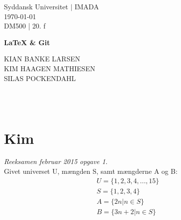 \documentclass[12pt, a4paper]{article}
\begin{document}
\begin{titlepage} 
\begin{centering}
\large Syddansk Universitet $|$ IMADA \\
\today \\
DM500 | 20. f\\

\vspace{4CM}

\huge{\bf \LaTeX{} \& Git } \\

\vspace{\fill}

\fontsize{14}{19.2} {
    \selectfont
    KIAN BANKE LARSEN \vspace{5pt} \\
    KIM HAAGEN MATHIESEN \vspace{5pt} \\
    SILAS POCKENDAHL \vspace{5pt} \\
    \quad
} \\

\vspace{\fill}

\\\vspace{.55cm}
\end{centering}

\end{titlepage}

\section{Kim}
\textit{Reeksamen februar 2015 opgave 1.}\\
Givet universet U, mængden S, samt mængderne A og B: \\
    \begin{gather*}
    U = \{1, 2, 3, 4, ..., 15\} \\ 
        S = \{1, 2, 3, 4\}\\
        A = \{ 2n | n \in S \}\\
        B = \{ 3n+2 | n \in S \}
    \end{gather*}
         
\end{document}
